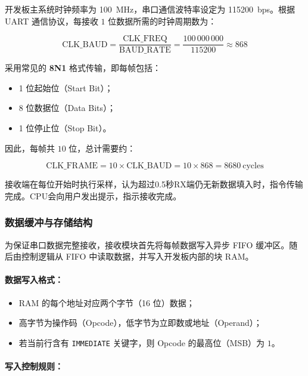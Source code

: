\documentclass[lang=cn,a4paper,newtx]{elegantpaper}
\begin{document}
开发板主系统时钟频率为 \SI{100}{\mega\hertz}，串口通信波特率设定为 \SI{115200}{bps}。根据 UART 通信协议，每接收 $1$ 位数据所需的时钟周期数为：

\begin{equation}
  \text{CLK\_BAUD} = \frac{\text{CLK\_FREQ}}{\text{BAUD\_RATE}} = \frac{100\,000\,000}{115200} \approx 868
\end{equation}

采用常见的 \textbf{8N1} 格式传输，即每帧包括：

\begin{itemize}
  \item 1 位起始位（Start Bit）；
  \item 8 位数据位（Data Bits）；
  \item 1 位停止位（Stop Bit）。
\end{itemize}

因此，每帧共 $10$ 位，总计需要约：

\begin{equation}
  \text{CLK\_FRAME} = 10 \times \text{CLK\_BAUD} = 10 \times 868 = 8680\ \text{cycles}
\end{equation}

接收端在每位开始时执行采样，认为超过0.5秒RX端仍无新数据填入时，指令传输完成。CPU会向用户发出提示，指示接收完成。

\subsubsection{数据缓冲与存储结构}

为保证串口数据完整接收，接收模块首先将每帧数据写入异步 FIFO 缓冲区。随后由控制逻辑从 FIFO 中读取数据，并写入开发板内部的块 RAM。

\paragraph{数据写入格式：}

\begin{itemize}
  \item RAM 的每个地址对应两个字节（16 位）数据；
  \item 高字节为操作码（Opcode），低字节为立即数或地址（Operand）；
  \item 若当前行含有 \texttt{IMMEDIATE} 关键字，则 Opcode 的最高位（MSB）为 $1$。
\end{itemize}

\paragraph{写入控制规则：}
\end{document}
